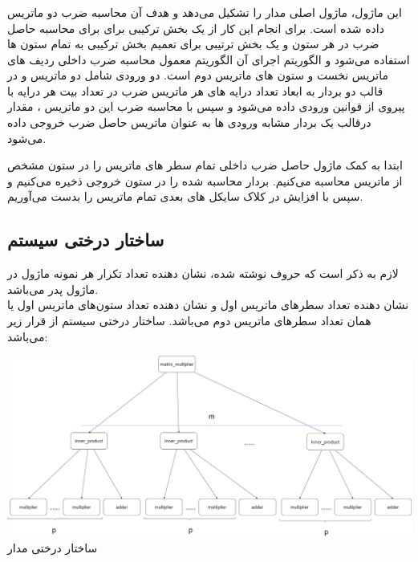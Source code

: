 \documentclass[12pt,titlepage,a4page , tikz , multi,table , svgnames,xcdraw]{article}
\begin{document}
\subsubsection{}
این ماژول، ماژول اصلی مدار را تشکیل می‌دهد و هدف آن محاسبه ضرب دو ماتریس داده شده است.
برای انجام این کار از یک بخش ترکیبی برای برای محاسبه حاصل ضرب در هر ستون و یک بخش ترتیبی برای تعمیم بخش ترکیبی به تمام ستون ها استفاده می‌شود و الگوریتم اجرای آن الگوریتم معمول محاسبه ضرب داخلی ردیف های ماتریس نخست و ستون های ماتریس دوم است.
 دو ورودی شامل دو ماتریس 
  و 
  در قالب دو بردار به ابعاد تعداد درایه های هر ماتریس ضرب در تعداد بیت هر درایه با پیروی از قوانین 
  ورودی داده می‌شود و سپس با محاسبه ضرب این دو ماتریس ، مقدار درقالب یک بردار مشابه ورودی ها به عنوان ماتریس حاصل ضرب خروجی داده می‌شود.

ابتدا به کمک ماژول 
حاصل ضرب داخلی تمام سطر های ماتریس 
 را در ستون مشخص 
 از ماتریس 
 محاسبه می‌کنیم. بردار محاسبه شده را در ستون 
 خروجی 
 ذخیره می‌کنیم و سپس با افزایش 
 در کلاک سایکل های بعدی تمام ماتریس 
 را بدست می‌آوریم.

\subsection{ساختار درختی سیستم}
لازم به ذکر است که حروف نوشته شده، نشان دهنده تعداد تکرار هر نمونه ماژول در ماژول پدر می‌باشد. \\ 
 نشان دهنده تعداد سطرهای ماتریس اول و 
 نشان دهنده تعداد ستون‌های ماتریس اول یا همان تعداد سطرهای ماتریس دوم می‌باشد. ساختار درختی سیستم از قرار زیر می‌باشد:
\begin{center}
\includegraphics[scale=0.2]
    {Images/System Architecture/DSD_Project_hierarchy.png}\\
    \caption{ساختار درختی مدار}
\end{center}

\newpage
\end{document}
